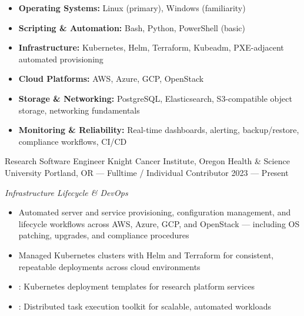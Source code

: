 




\begin{itemize}
    \item \textbf{Operating Systems:} Linux (primary), Windows (familiarity)
    \item \textbf{Scripting \& Automation:} Bash, Python, PowerShell (basic)
    \item \textbf{Infrastructure:} Kubernetes, Helm, Terraform, Kubeadm, PXE-adjacent automated provisioning
    \item \textbf{Cloud Platforms:} AWS, Azure, GCP, OpenStack
    \item \textbf{Storage \& Networking:} PostgreSQL, Elasticsearch, S3-compatible object storage, networking fundamentals
    \item \textbf{Monitoring \& Reliability:} Real-time dashboards, alerting, backup/restore, compliance workflows, CI/CD
\end{itemize}


\showoff
{Research Software Engineer}
{Knight Cancer Institute, Oregon Health \& Science University}
{Portland, OR --- Fulltime / Individual Contributor}
{2023 --- Present}

\vspace{1em}

\emph{Infrastructure Lifecycle \& DevOps}

\begin{itemize}
    \item Automated server and service provisioning, configuration management, and lifecycle workflows across AWS, Azure, GCP, and OpenStack --- including OS patching, upgrades, and compliance procedures
    \item Managed Kubernetes clusters with Helm and Terraform for consistent, repeatable deployments across cloud environments
    \item {}: Kubernetes deployment templates for research platform services
    \item {}: Distributed task execution toolkit for scalable, automated workloads
\end{itemize}

